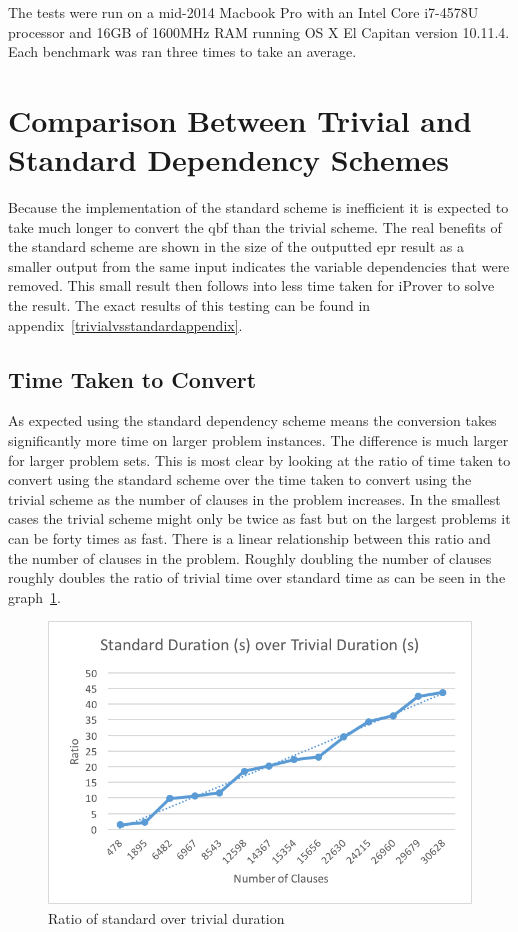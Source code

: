 The tests were run on a mid-2014 Macbook Pro with an Intel Core i7-4578U processor and 16GB of 1600MHz RAM running OS X El Capitan version 10.11.4. Each benchmark was ran three times to take an average.

\section{Comparison Between Trivial and Standard Dependency Schemes} \label{trivialvsstd}
Because the implementation of the standard scheme is inefficient it is expected to take much longer to convert the \gls{qbf} than the trivial scheme. The real benefits of the standard scheme are shown in the size of the outputted \gls{epr} result as a smaller output from the same input indicates the variable dependencies that were removed. This small result then follows into less time taken for iProver to solve the result. The exact results of this testing can be found in appendix~\ref{trivialvsstandardappendix}.

\subsection{Time Taken to Convert}
As expected using the standard dependency scheme means the conversion takes significantly more time on larger problem instances. The difference is much larger for larger problem sets. This is most clear by looking at the ratio of time taken to convert using the standard scheme over the time taken to convert using the trivial scheme as the number of clauses in the problem increases. In the smallest cases the trivial scheme might only be twice as fast but on the largest problems it can be forty times as fast. There is a linear relationship between this ratio and the number of clauses in the problem. Roughly doubling the number of clauses roughly doubles the ratio of trivial time over standard time as can be seen in the graph~\ref{standarddurationovertrivialduration}.

\begin{figure}[h]
\caption{Ratio of standard over trivial duration}
\label{standarddurationovertrivialduration}
\begin{CenteredBox}
\includegraphics{png/standarddurationovertrivialduration.png}
\end{CenteredBox}
\end{figure}

